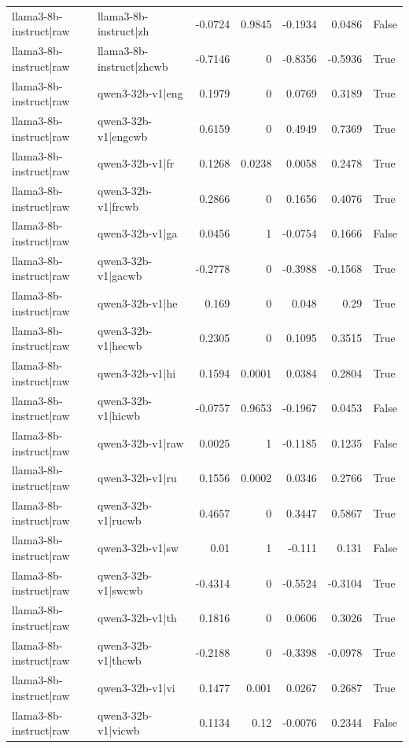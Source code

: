 \begin{table}
\begin{tabular}{l l r r r r l}
llama3-8b-instruct|raw & llama3-8b-instruct|zh & -0.0724 & 0.9845 & -0.1934 & 0.0486 & False \\
llama3-8b-instruct|raw & llama3-8b-instruct|zhcwb & -0.7146 & 0 & -0.8356 & -0.5936 & True \\
llama3-8b-instruct|raw & qwen3-32b-v1|eng & 0.1979 & 0 & 0.0769 & 0.3189 & True \\
llama3-8b-instruct|raw & qwen3-32b-v1|engcwb & 0.6159 & 0 & 0.4949 & 0.7369 & True \\
llama3-8b-instruct|raw & qwen3-32b-v1|fr & 0.1268 & 0.0238 & 0.0058 & 0.2478 & True \\
llama3-8b-instruct|raw & qwen3-32b-v1|frcwb & 0.2866 & 0 & 0.1656 & 0.4076 & True \\
llama3-8b-instruct|raw & qwen3-32b-v1|ga & 0.0456 & 1 & -0.0754 & 0.1666 & False \\
llama3-8b-instruct|raw & qwen3-32b-v1|gacwb & -0.2778 & 0 & -0.3988 & -0.1568 & True \\
llama3-8b-instruct|raw & qwen3-32b-v1|he & 0.169 & 0 & 0.048 & 0.29 & True \\
llama3-8b-instruct|raw & qwen3-32b-v1|hecwb & 0.2305 & 0 & 0.1095 & 0.3515 & True \\
llama3-8b-instruct|raw & qwen3-32b-v1|hi & 0.1594 & 0.0001 & 0.0384 & 0.2804 & True \\
llama3-8b-instruct|raw & qwen3-32b-v1|hicwb & -0.0757 & 0.9653 & -0.1967 & 0.0453 & False \\
llama3-8b-instruct|raw & qwen3-32b-v1|raw & 0.0025 & 1 & -0.1185 & 0.1235 & False \\
llama3-8b-instruct|raw & qwen3-32b-v1|ru & 0.1556 & 0.0002 & 0.0346 & 0.2766 & True \\
llama3-8b-instruct|raw & qwen3-32b-v1|rucwb & 0.4657 & 0 & 0.3447 & 0.5867 & True \\
llama3-8b-instruct|raw & qwen3-32b-v1|sw & 0.01 & 1 & -0.111 & 0.131 & False \\
llama3-8b-instruct|raw & qwen3-32b-v1|swcwb & -0.4314 & 0 & -0.5524 & -0.3104 & True \\
llama3-8b-instruct|raw & qwen3-32b-v1|th & 0.1816 & 0 & 0.0606 & 0.3026 & True \\
llama3-8b-instruct|raw & qwen3-32b-v1|thcwb & -0.2188 & 0 & -0.3398 & -0.0978 & True \\
llama3-8b-instruct|raw & qwen3-32b-v1|vi & 0.1477 & 0.001 & 0.0267 & 0.2687 & True \\
llama3-8b-instruct|raw & qwen3-32b-v1|vicwb & 0.1134 & 0.12 & -0.0076 & 0.2344 & False \\

\end{tabular}
\end{table}
